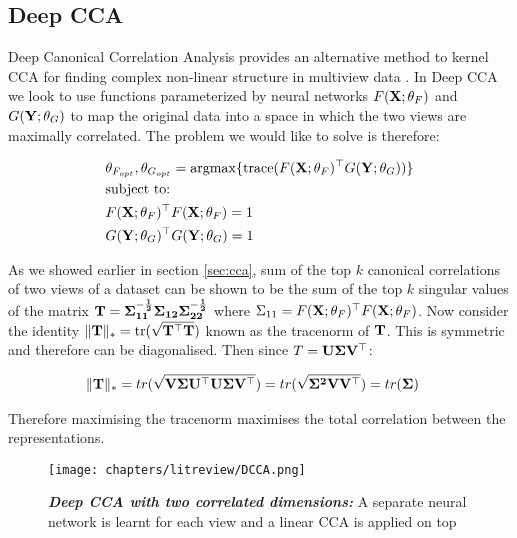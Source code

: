 \subsection{Deep CCA}

Deep Canonical Correlation Analysis provides an alternative method to kernel CCA for finding complex non-linear structure in multiview data \cite{andrew2013deep}. In Deep CCA we look to use functions parameterized by neural networks $F(\bold{X};\theta_F)$ and $G(\bold{Y};\theta_G)$ to map the original data into a space in which the two views are maximally correlated. The problem we would like to solve is therefore:

\begin{align}
    & \theta_{F_{opt}},\theta_{G_{opt}}=\mathrm{argmax}\{\text{trace}( F(\bold{X};\theta_F)^{\top}G(\bold{Y};\theta_G))  \}\\
    & \text{subject to:} \notag\\
    & F(\bold{X};\theta_F)^{\top}F(\bold{X};\theta_F)=1 \notag\\
    & G(\bold{Y};\theta_G)^{\top}G(\bold{Y};\theta_G)=1 \notag
\end{align}

As we showed earlier in section \ref{sec:cca}, sum of the top $k$ canonical correlations of two views of a dataset can be shown to be the sum of the top $k$ singular values of the matrix $\bold{T}=\bold{\Sigma_{11}^{-\frac{1}{2}}\Sigma_{12}\Sigma_{22}^{-\frac{1}{2}}}$ where $\Sigma_{11}=F(\bold{X};\theta_F)^{\top}F(\bold{X};\theta_F)$. Now consider the identity $\|\bold{T}\|_*=\text{tr}(\sqrt{\bold{T^{\top}T}})$ known as the tracenorm of $\bold{T}$. This is symmetric and therefore can be diagonalised. Then since $T=\bold{U\Sigma V^{\top}}$:

\begin{align}
    & \|\bold{T}\|_*=tr(\sqrt{\bold{V\Sigma U^{\top}U\Sigma V^{\top}}})=tr(\sqrt{\bold{\Sigma^2 VV^{\top}}})=tr(\bold{\Sigma})
\end{align}

Therefore maximising the tracenorm maximises the total correlation between the representations.

\begin{figure}[H] %
    \centering %
    \texttt{[image: chapters/litreview/DCCA.png]}
    \caption[Deep CCA Representation]{\textit{\textbf{Deep CCA with two correlated dimensions:}} A separate neural network is learnt for each view and a linear CCA is applied on top \cite{andrew2013deep}}
    \label{img:DCCA}
\end{figure}

